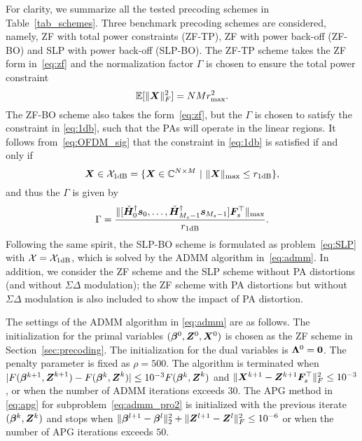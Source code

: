 \documentclass[10pt,twocolumn,twoside]{IEEEtran}
\begin{document}
For clarity, we summarize all the tested precoding schemes in Table~\ref{tab_schemes}.
Three benchmark precoding schemes are considered, namely, ZF with total power constraints (ZF-TP), ZF with power back-off (ZF-BO) and SLP with power back-off (SLP-BO).
The ZF-TP scheme takes the ZF form in~\eqref{eq:zf} and the normalization factor $\Gamma$ is chosen to ensure the total power constraint
\begin{equation}\label{eq:ZF_TPC}
	\mathbb{E}[\|{\bm X}\|_F^2] = NMr_{\rm max}^2.
\end{equation}
The ZF-BO scheme also takes the form~\eqref{eq:zf}, but the $\Gamma$ is chosen to satisfy the constraint in \eqref{eq:1db}, such that the PAs will operate in the linear regions.
It follows from~\eqref{eq:OFDM_sig} that the constraint in \eqref{eq:1db} is satisfied if and only if
\begin{equation}\label{eq:const_1db}
	{\bm X} \in \mathcal{X}_{\rm 1dB} = \{ {\bm X} \in \mathbb{C}^{N \times M} ~\vert~  \|{\bm X}\|_{\rm max} \le r_{\rm 1dB} \},
\end{equation}
and thus the $\Gamma$ is given by
\[
\Gamma = \frac{\| [\check{{\bm H}}_0^\dagger{\bm s}_0,\dots,\check{{\bm H}}_{M_s-1}^\dagger{\bm s}_{M_s-1}] {\bm F}_s^\top \|_{\rm max} }{r_{\rm 1dB}}.
\]
Following the same spirit, the SLP-BO scheme is formulated as problem~\eqref{eq:SLP} with $\mathcal{X} = \mathcal{X}_{\rm 1dB}$, which is solved by the ADMM algorithm in~\eqref{eq:admm}.
In addition, we consider the ZF scheme and the SLP scheme without PA distortions (and  without $\Sigma \Delta$ modulation); the ZF scheme with PA distortions but without $\Sigma \Delta$ modulation is also included to show the impact of PA distortion.



The settings of the ADMM algorithm in \eqref{eq:admm} are as follows.
The initialization for the primal variables $(\bm \beta^0, {\bm Z}^0, {\bm X}^0)$ is chosen as the ZF scheme in Section~\ref{sec:precoding}.
The initialization for the dual variables is $\bm \Lambda^0={\bm 0}$.
The penalty parameter is fixed as $\rho=500$.
The algorithm is terminated when $|F(\bm \beta^{k+1}, \bm {{\bm Z}}^{k+1})-F(\bm \beta^{k}, \bm {{\bm Z}}^{k})| \le 10^{-3}F(\bm \beta^{k}, \bm {{\bm Z}}^{k})$ and $\|{\bm X}^{k+1} - {\bm Z}^{k+1} {\bm F}_s^\top\|_F^2 \le 10^{-3}$, or when the number of ADMM iterations exceeds $30$.
The APG method in \eqref{eq:apg} for subproblem~\eqref{eq:admm_pro2} is initialized with the previous iterate $(\bm \beta^k, {\bm Z}^k)$ and stops when $\|\bm \beta^{l+1}-\bm \beta^l\|_2^2 +  \|{\bm Z}^{l+1}-{\bm Z}^l\|_F^2\le 10^{-6}$ or when the number of APG iterations exceeds $50$.
\end{document}
